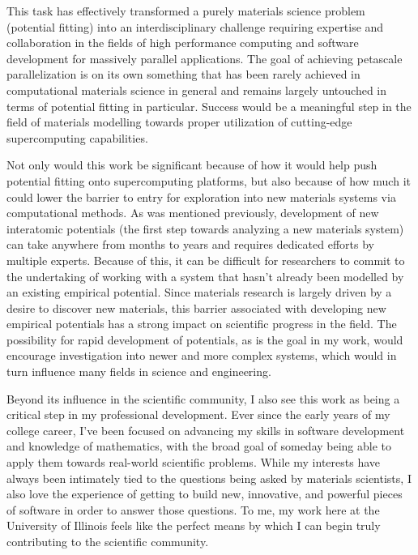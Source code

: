 \documentclass{article}
\begin{document}
\bigskip

This task has effectively transformed a purely materials science problem (potential fitting) into an interdisciplinary challenge requiring expertise and collaboration in the fields of high performance computing and software development for massively parallel applications. The goal of achieving petascale parallelization is on its own something that has been rarely achieved in computational materials science in general and remains largely untouched in terms of potential fitting in particular. Success would be a meaningful step in the field of materials modelling towards proper utilization of cutting-edge supercomputing capabilities.

Not only would this work be significant because of how it would help push potential fitting onto supercomputing platforms, but also because of how much it could lower the barrier to entry for exploration into new materials systems via computational methods. As was mentioned previously, development of new interatomic potentials (the first step towards analyzing a new materials system) can take anywhere from months to years and requires dedicated efforts by multiple experts. Because of this, it can be difficult for researchers to commit to the undertaking of working with a system that hasn't already been modelled by an existing empirical potential. Since materials research is largely driven by a desire to discover new materials, this barrier associated with developing new empirical potentials has a strong impact on scientific progress in the field. The possibility for rapid development of potentials, as is the goal in my work, would encourage investigation into newer and more complex systems, which would in turn influence many fields in science and engineering.

\bigskip

Beyond its influence in the scientific community, I also see this work as being a critical step in my professional development. Ever since the early years of my college career, I've been focused on advancing my skills in software development and knowledge of mathematics, with the broad goal of someday being able to apply them towards real-world scientific problems. While my interests have always been intimately tied to the questions being asked by materials scientists, I also love the experience of getting to build new, innovative, and powerful pieces of software in order to answer those questions. To me, my work here at the University of Illinois feels like the perfect means by which I can begin truly contributing to the scientific community.
\end{document}
